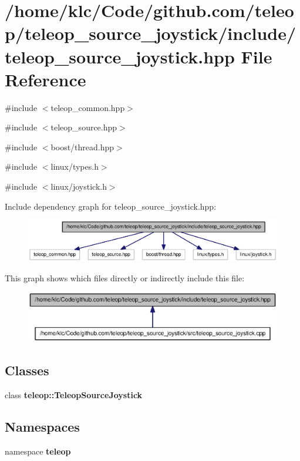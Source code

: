 \section{/home/klc/Code/github.com/teleop/teleop\_\-source\_\-joystick/include/teleop\_\-source\_\-joystick.hpp File Reference}
\label{teleop__source__joystick_8hpp}
{\ttfamily \#include $<$teleop\_\-common.hpp$>$}\par
{\ttfamily \#include $<$teleop\_\-source.hpp$>$}\par
{\ttfamily \#include $<$boost/thread.hpp$>$}\par
{\ttfamily \#include $<$linux/types.h$>$}\par
{\ttfamily \#include $<$linux/joystick.h$>$}\par
Include dependency graph for teleop\_\-source\_\-joystick.hpp:
\nopagebreak
\begin{figure}[H]
\begin{center}
\leavevmode
\includegraphics[width=400pt]{teleop__source__joystick_8hpp__incl}
\end{center}
\end{figure}
This graph shows which files directly or indirectly include this file:
\nopagebreak
\begin{figure}[H]
\begin{center}
\leavevmode
\includegraphics[width=400pt]{teleop__source__joystick_8hpp__dep__incl}
\end{center}
\end{figure}
\subsection*{Classes}
\begin{DoxyCompactItemize}
\item 
class {\bf teleop::TeleopSourceJoystick}
\end{DoxyCompactItemize}
\subsection*{Namespaces}
\begin{DoxyCompactItemize}
\item 
namespace {\bf teleop}
\end{DoxyCompactItemize}
